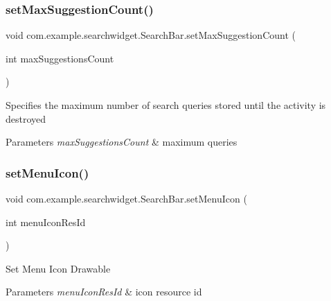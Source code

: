 \subsubsection{\texorpdfstring{setMaxSuggestionCount()}{setMaxSuggestionCount()}}
{\footnotesize\ttfamily void com.\+example.\+searchwidget.\+Search\+Bar.\+set\+Max\+Suggestion\+Count (\begin{DoxyParamCaption}\item[{int}]{max\+Suggestions\+Count }\end{DoxyParamCaption})}

Specifies the maximum number of search queries stored until the activity is destroyed


\begin{DoxyParams}{Parameters}
{\em max\+Suggestions\+Count} & maximum queries \\
\hline
\end{DoxyParams}
\mbox{\label{classcom_1_1example_1_1searchwidget_1_1_search_bar_a06e0a90b2e6483038bb3d28a92a1a05c}} 
\subsubsection{\texorpdfstring{setMenuIcon()}{setMenuIcon()}}
{\footnotesize\ttfamily void com.\+example.\+searchwidget.\+Search\+Bar.\+set\+Menu\+Icon (\begin{DoxyParamCaption}\item[{int}]{menu\+Icon\+Res\+Id }\end{DoxyParamCaption})}

Set Menu Icon Drawable


\begin{DoxyParams}{Parameters}
{\em menu\+Icon\+Res\+Id} & icon resource id \\
\hline
\end{DoxyParams}
\mbox{\label{classcom_1_1example_1_1searchwidget_1_1_search_bar_a14d304a30b0065246ea3319c730f2e5c}} 
